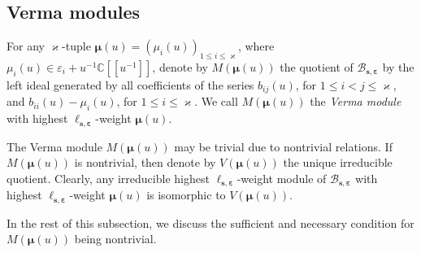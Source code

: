 \documentclass[11pt,reqno]{amsart}
\numberwithin{equation}{section}
\theoremstyle{definition}
\theoremstyle{remark}
\newcommand{\C}{\mathbb{C}}
\newcommand{\lle}{\leqslant}
\newcommand{\BMN}{{\mathscr{B}_{\bm s,\bm \ve}}}
\newcommand{\ka}{\varkappa}
\newcommand{\ve}{\varepsilon}
\newcommand{\s}{{\bm s}}
\begin{document}
\subsection{Verma modules}
For any $\ka$-tuple $\bm\mu(u)=(\mu_i(u))_{1\lle i\lle \ka}$, where $\mu_i(u)\in \ve_i+u^{-1}\C[[u^{-1}]]$, denote by $M(\bm\mu(u))$ the quotient of $\BMN$ by the left ideal generated by all coefficients of the series $b_{ij}(u)$, for $1\lle i<j\lle \ka$, and $b_{ii}(u)-\mu_i(u)$, for $1\lle i\lle \ka$. We call $M(\bm\mu(u))$ the {\it Verma module} with highest $\ell_{\s,\bm\ve}$-weight $\bm\mu(u)$.

The Verma module $M(\bm\mu(u))$ may be trivial due to nontrivial relations. If $M(\bm\mu(u))$ is nontrivial, then denote by $V(\bm\mu(u))$ the unique irreducible quotient. Clearly, any irreducible highest $\ell_{\s,\bm\ve}$-weight module of $\BMN$ with highest $\ell_{\s,\bm\ve}$-weight $\bm\mu(u)$ is isomorphic to $V(\bm\mu(u))$.

In the rest of this subsection, we discuss the sufficient and necessary condition for $M(\bm\mu(u))$ being nontrivial.
\end{document}
